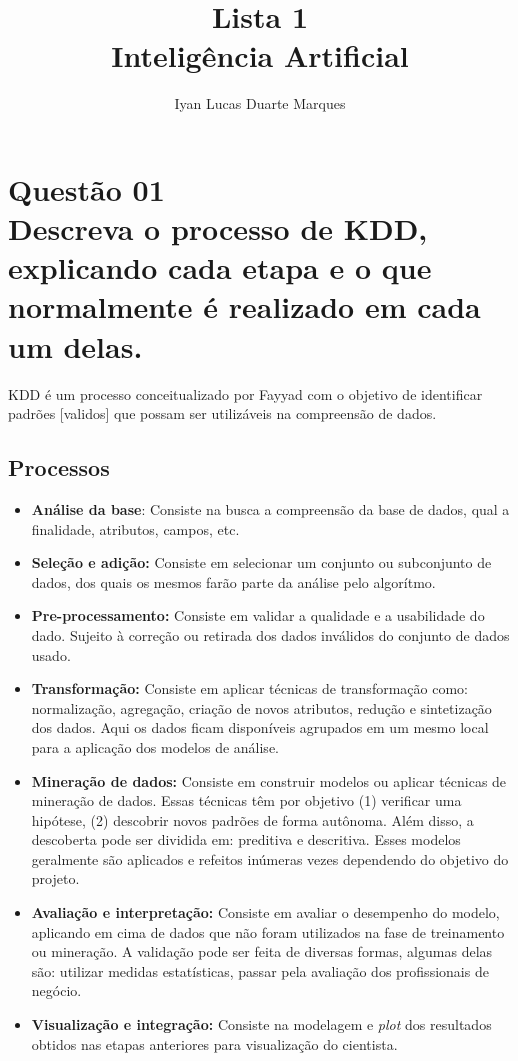 \documentclass[12pt]{article}
\title{Lista 1\\ Inteligência Artificial}
\author{Iyan Lucas Duarte Marques\inst{1}}
\begin{document}
\maketitle

\section{Questão 01\\
Descreva o processo de KDD, explicando cada etapa e o que normalmente é realizado
em cada um delas.
}
KDD é um processo conceitualizado por Fayyad com o objetivo de identificar padrões [validos] que possam ser utilizáveis na compreensão de dados.
\subsection{Processos}
\begin{itemize}
    \item \textbf{Análise da base}:
    Consiste na busca a compreensão da base de dados, qual a finalidade, atributos, campos, etc. 
    \item \textbf{Seleção e adição:}
    Consiste em selecionar um conjunto ou subconjunto de dados, dos quais os mesmos farão parte da análise pelo algorítmo.
    \item \textbf{Pre-processamento:}
    Consiste em validar a qualidade e a usabilidade do dado. 
    Sujeito à correção ou retirada dos dados inválidos do conjunto de dados usado.
    \item \textbf{Transformação:}
    Consiste em aplicar técnicas de transformação como: normalização, agregação, criação de novos atributos, redução e sintetização dos dados.
    Aqui os dados ficam disponíveis agrupados em um mesmo local para a aplicação dos modelos de análise.
    \item \textbf{Mineração de dados:}
    Consiste em construir modelos ou aplicar técnicas de mineração de dados. Essas técnicas têm por objetivo (1) verificar uma hipótese, (2) descobrir novos padrões de forma autônoma.
    Além disso, a descoberta pode ser dividida em: preditiva e descritiva.
    Esses modelos geralmente são aplicados e refeitos inúmeras vezes dependendo do objetivo do projeto.
    \item \textbf{Avaliação e interpretação:}
    Consiste em avaliar o desempenho do modelo, aplicando em cima de dados que não foram utilizados na fase de treinamento ou mineração.
    A validação pode ser feita de diversas formas, algumas delas são: utilizar medidas estatísticas, passar pela avaliação dos profissionais de negócio.
    \item \textbf{Visualização e integração:}
    Consiste na modelagem e \textit{plot} dos resultados obtidos nas etapas anteriores para visualização do cientista.
\end{itemize}
\end{document}
